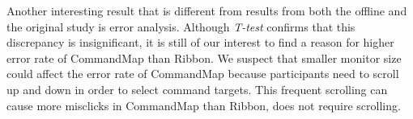 \documentclass{article}
\begin{document}
Another interesting result that is different from results from both the offline and the original study is error analysis. Although \textit{T-test} confirms that this discrepancy is insignificant, it is still of our interest to find a reason for higher error rate of CommandMap than Ribbon. We suspect that smaller monitor size could affect the error rate of CommandMap because participants need to scroll up and down in order to select command targets. This frequent scrolling can cause more misclicks in CommandMap than Ribbon, does not require scrolling. 

\pagebreak
\end{document}
